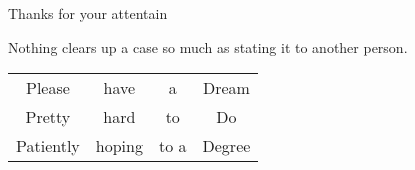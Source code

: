 \begin{frame}
\par
\bigskip

\centerline{\huge Thanks for your attentain~}

\par
\bigskip
\centerline{Nothing clears up a case so much as stating it to another person.}
\par
\bigskip
\begin{center}
\begin{tabular}{c c c c} %
{\color{red}P}lease & {\color{red}h}ave & a & {\color{red}D}ream\\
{\color{red}P}retty & {\color{red}h}ard   & to & {\color{red}D}o \\
{\color{red}P}atiently & {\color{red}h}oping  & to a & {\color{red}D}egree\\ 
\end{tabular}
\end{center}
\end{frame}




